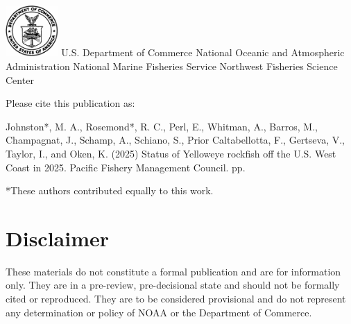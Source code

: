 \documentclass[
]{scrartcl}
\renewcommand*\contentsname{Table of contents}
\newcommand\contentsname{Table of contents}
\begin{document}
\begin{titlepage}
\begin{minipage}[b][\textheight][s]{\textwidth}
  \includegraphics[alt={},width=2cm]{support_files/us_doc_logo.png}\newline %
  U.S. Department of Commerce\newline
  National Oceanic and Atmospheric Administration\newline
  National Marine Fisheries Service\newline
  Northwest Fisheries Science Center\newline

  \end{minipage}
  \restoregeometry
  \end{titlepage}

\renewcommand*\contentsname{Table of contents}
{
\hypersetup{linkcolor=}
\setcounter{tocdepth}{3}
\tableofcontents
}
\setcounter{page}{1}

\renewcommand{\thetable}{\roman{table}}
\renewcommand{\thefigure}{\roman{figure}}

\newpage{}

Please cite this publication as:

Johnston*, M. A., Rosemond*, R. C., Perl, E., Whitman, A., Barros, M.,
Champagnat, J., Schamp, A., Schiano, S., Prior Caltabellotta, F.,
Gertseva, V., Taylor, I., and Oken, K. (2025) Status of Yelloweye
rockfish off the U.S. West Coast in 2025. Pacific Fishery Management
Council. \pageref*{LastPage}{} pp.

*These authors contributed equally to this work.

\newpage{}

\setcounter{page}{1}

\renewcommand{\thetable}{\roman{table}}
\renewcommand{\thefigure}{\roman{figure}}

\section*{Disclaimer}\label{disclaimer}

These materials do not constitute a formal publication and are for
information only. They are in a pre-review, pre-decisional state and
should not be formally cited or reproduced. They are to be considered
provisional and do not represent any determination or policy of NOAA or
the Department of Commerce.
\end{document}
